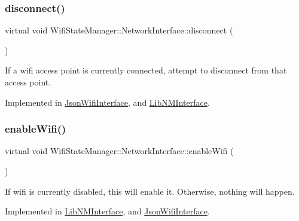 \subsubsection{\texorpdfstring{disconnect()}{disconnect()}}
{\footnotesize\ttfamily virtual void Wifi\+State\+Manager\+::\+Network\+Interface\+::disconnect (\begin{DoxyParamCaption}{ }\end{DoxyParamCaption})\hspace{0.3cm}{\ttfamily [pure virtual]}}

If a wifi access point is currently connected, attempt to disconnect from that access point. 

Implemented in \mbox{\hyperlink{classJsonWifiInterface_a4e9f35812633e8b2b50463f9523585e0}{Json\+Wifi\+Interface}}, and \mbox{\hyperlink{classLibNMInterface_af86c4e620e1292428e8955bad4617805}{Lib\+N\+M\+Interface}}.

\mbox{\label{classWifiStateManager_1_1NetworkInterface_a276f17f2d4aa943e9781dcc1b5e93e54}} 
\subsubsection{\texorpdfstring{enable\+Wifi()}{enableWifi()}}
{\footnotesize\ttfamily virtual void Wifi\+State\+Manager\+::\+Network\+Interface\+::enable\+Wifi (\begin{DoxyParamCaption}{ }\end{DoxyParamCaption})\hspace{0.3cm}{\ttfamily [pure virtual]}}

If wifi is currently disabled, this will enable it. Otherwise, nothing will happen. 

Implemented in \mbox{\hyperlink{classLibNMInterface_ab50348ebed5778ecc56346e7b3419978}{Lib\+N\+M\+Interface}}, and \mbox{\hyperlink{classJsonWifiInterface_ac87e53c922fb19cf684d94d174aa6274}{Json\+Wifi\+Interface}}.

\mbox{\label{classWifiStateManager_1_1NetworkInterface_a924f90089b1d0a64771b904bc96ce81a}} 
